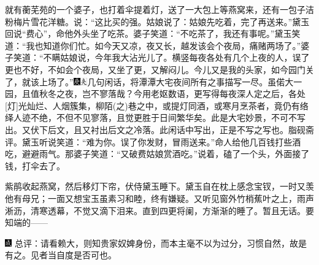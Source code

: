 就有蘅芜苑的一个婆子，也打着伞提着灯，送了一大包上等燕窝来，还有一包子洁粉梅片雪花洋糖。说：``这比买的强。姑娘说了：姑娘先吃着，完了再送来。''黛玉回说``费心''，命他外头坐了吃茶。婆子笑道：``不吃茶了，我还有事呢。''黛玉笑道：``我也知道你们忙。如今天又凉，夜又长，越发该会个夜局，痛赌两场了。''婆子笑道：``不瞒姑娘说，今年我大沾光儿了。横竖每夜各处有几个上夜的人，误了更也不好，不如会个夜局，又坐了更，又解闷儿。今儿又是我的头家，如今园门关了，就该上场了。''{\includegraphics[width=3mm]{../Images/00004}\includegraphics[width=3mm]{../Images/00012}\footnotesize \kaishu 几句闲话，将潭潭大宅夜间所有之事描写一尽。虽偌大一园，且值秋冬之夜，岂不寥落哉？今用老妪数语，更写得每夜深人定之后，各处{[}灯{]}光灿烂、人烟簇集，柳陌{(之)}巷之中，或提灯同酒，或寒月烹茶者，竟仍有络绎人迹不绝，不但不见寥落，且觉更胜于日间繁华矣。此是大宅妙景，不可不写出。又伏下后文，且又衬出后文之冷落。此闲话中写出，正是不写之写也。脂砚斋评。}黛玉听说笑道：``难为你。误了你发财，冒雨送来。''命人给他几百钱打些酒吃，避避雨气。那婆子笑道：``又破费姑娘赏酒吃。''说着，磕了一个头，外面接了钱，打伞去了。

紫鹃收起燕窝，然后移灯下帘，伏侍黛玉睡下。黛玉自在枕上感念宝钗，一时又羡他有母兄；一面又想宝玉虽素习和睦，终有嫌疑。又听见窗外竹梢蕉叶之上，雨声淅沥，清寒透幕，不觉又滴下泪来。直到四更将阑，方渐渐的睡了。暂且无话。要知端的------

{\includegraphics[width=3mm]{../Images/00005}  \kaishu 总评：请看赖大，则知贵家奴婢身份，而本主毫不以为过分，习惯自然，故是有之。见者当自度是否可也。}
